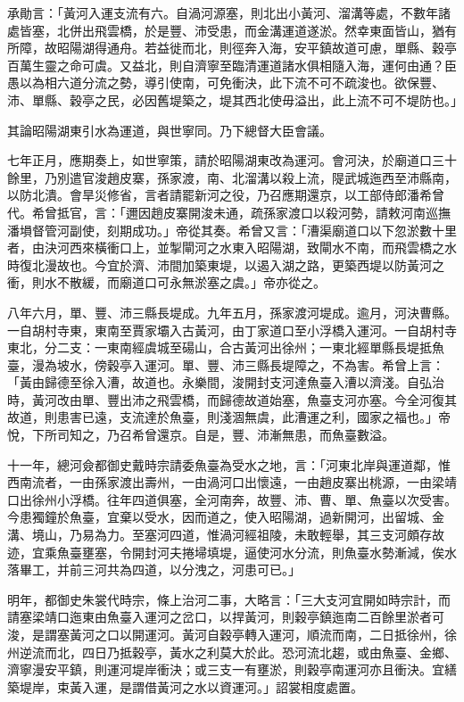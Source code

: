 承勛言：「黃河入運支流有六。自渦河源塞，則北出小黃河、溜溝等處，不數年諸處皆塞，北併出飛雲橋，於是豐、沛受患，而金溝運道遂淤。然幸東面皆山，猶有所障，故昭陽湖得通舟。若益徙而北，則徑奔入海，安平鎮故道可慮，單縣、穀亭百萬生靈之命可虞。又益北，則自濟寧至臨清運道諸水俱相隨入海，運何由通？臣愚以為相六道分流之勢，導引使南，可免衝決，此下流不可不疏浚也。欲保豐、沛、單縣、穀亭之民，必因舊堤築之，堤其西北使毋溢出，此上流不可不堤防也。」

其論昭陽湖東引水為運道，與世寧同。乃下總督大臣會議。

七年正月，應期奏上，如世寧策，請於昭陽湖東改為運河。會河決，於廟道口三十餘里，乃別遣官浚趙皮寨，孫家渡，南、北溜溝以殺上流，隄武城迤西至沛縣南，以防北潰。會旱災修省，言者請罷新河之役，乃召應期還京，以工部侍郎潘希曾代。希曾抵官，言：「邇因趙皮寨開浚未通，疏孫家渡口以殺河勢，請敕河南巡撫潘塤督管河副使，刻期成功。」帝從其奏。希曾又言：「漕渠廟道口以下忽淤數十里者，由決河西來橫衝口上，並掣閘河之水東入昭陽湖，致閘水不南，而飛雲橋之水時復北漫故也。今宜於濟、沛間加築東堤，以遏入湖之路，更築西堤以防黃河之衝，則水不散緩，而廟道口可永無淤塞之虞。」帝亦從之。

八年六月，單、豐、沛三縣長堤成。九年五月，孫家渡河堤成。逾月，河決曹縣。一自胡村寺東，東南至賈家壩入古黃河，由丁家道口至小浮橋入運河。一自胡村寺東北，分二支：一東南經虞城至碭山，合古黃河出徐州；一東北經單縣長堤抵魚臺，漫為坡水，傍穀亭入運河。單、豐、沛三縣長堤障之，不為害。希曾上言：「黃由歸德至徐入漕，故道也。永樂間，浚開封支河達魚臺入漕以濟淺。自弘治時，黃河改由單、豐出沛之飛雲橋，而歸德故道始塞，魚臺支河亦塞。今全河復其故道，則患害已遠，支流達於魚臺，則淺涸無虞，此漕運之利，國家之福也。」帝悅，下所司知之，乃召希曾還京。自是，豐、沛漸無患，而魚臺數溢。

十一年，總河僉都御史戴時宗請委魚臺為受水之地，言：「河東北岸與運道鄰，惟西南流者，一由孫家渡出壽州，一由渦河口出懷遠，一由趙皮寨出桃源，一由梁靖口出徐州小浮橋。往年四道俱塞，全河南奔，故豐、沛、曹、單、魚臺以次受害。今患獨鐘於魚臺，宜棄以受水，因而道之，使入昭陽湖，過新開河，出留城、金溝、境山，乃易為力。至塞河四道，惟渦河經祖陵，未敢輕舉，其三支河頗存故迹，宜乘魚臺壅塞，令開封河夫捲埽填堤，逼使河水分流，則魚臺水勢漸減，俟水落畢工，并前三河共為四道，以分洩之，河患可已。」

明年，都御史朱裳代時宗，條上治河二事，大略言：「三大支河宜開如時宗計，而請塞梁靖口迤東由魚臺入運河之岔口，以捍黃河，則穀亭鎮迤南二百餘里淤者可浚，是謂塞黃河之口以開運河。黃河自穀亭轉入運河，順流而南，二日抵徐州，徐州逆流而北，四日乃抵穀亭，黃水之利莫大於此。恐河流北趨，或由魚臺、金鄉、濟寧漫安平鎮，則運河堤岸衝決；或三支一有壅淤，則穀亭南運河亦且衝決。宜繕築堤岸，束黃入運，是謂借黃河之水以資運河。」詔裳相度處置。

